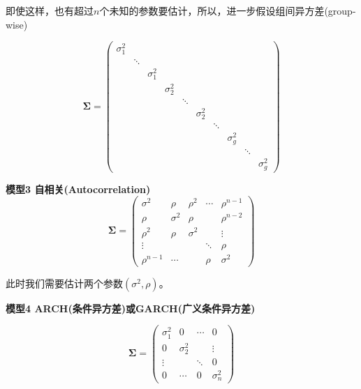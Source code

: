 即使这样，也有超过$ n $个未知的参数要估计，所以，进一步假设组间异方差(group-wise)

\begin{equation*}
	\boldsymbol{\Sigma} = \left(\begin{array}{cccccccccc}
		\sigma_{1}^{2} & & & & & & & & & \\
		& \ddots & & & & & & & & \\
		& & \sigma_{1}^{2} & & & & & & & \\
		& & & \sigma_{2}^{2} & & & & & & \\
		& & & & \ddots & & & & & \\
		& & & & & \sigma_{2}^{2} & & & & \\
		& & & & & & \ddots & & & \\
		& & & & & & & \sigma_{g}^{2} & & \\
		& & & & & & & & \ddots & \\
		& & & & & & & & & \sigma_{g}^{2}
	\end{array}\right)
\end{equation*}

\noindent \textbf{模型3 自相关(Autocorrelation)}
\begin{equation*}
	\boldsymbol{\Sigma} = \left(\begin{array}{ccccc}
		\sigma^{2} & \rho & \rho^{2} & \cdots & \rho^{n-1} \\
		\rho & \sigma^{2} & \rho & & \rho^{n-2} \\
		\rho^{2} & \rho & \sigma^{2} & & \vdots \\
		\vdots & & & \ddots & \rho \\
		\rho^{n-1} & \cdots & & \rho & \sigma^{2}
	\end{array}\right)
\end{equation*}

此时我们需要估计两个参数$ \left(\sigma^{2}, \rho\right) $。
	
\noindent \textbf{模型4 ARCH(条件异方差)或GARCH(广义条件异方差)}

\begin{equation*}
	\boldsymbol{\Sigma} = \left(\begin{array}{cccc}
		\sigma_{1}^{2} & 0 & \cdots & 0 \\
		0 & \sigma_{2}^{2} & & \vdots \\
		\vdots & & \ddots & 0 \\
		0 & \cdots & 0 & \sigma_{n}^{2}
	\end{array}\right)
\end{equation*}

